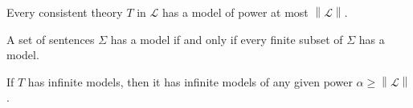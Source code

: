 \documentclass[../../main.tex]{subfiles}
\begin{document}
\begin{theorem}\cite[Corollary 2.1.4]{Cha90}
    Every consistent theory $T$ in $\mathcal{L}$ has a model of power at most $\left\lVert \mathcal{L} \right\rVert$.
\end{theorem}

\begin{theorem}\cite[Theorem 1.3.22]{Cha90}
    A set of sentences $\Sigma$ has a model if and only if every finite subset of $\Sigma$ has a model.
\end{theorem}

\begin{theorem}\cite[Corollary 2.1.6]{Cha90}
    If $T$ has infinite models, then it has infinite models of any given power $\alpha \geq \left\lVert \mathcal{L} \right\rVert$.
\end{theorem}
\end{document}
